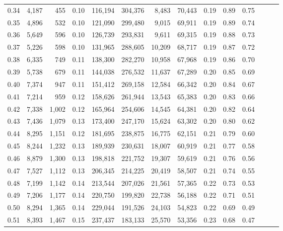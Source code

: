\begin{tabular}{rrrrrrrrrrrrrr}
0.34 &   4,187 &    455 &  0.10 &  116,194 &  304,376 &   8,483 &  70,443 &  0.19 &  0.89 &      0.75 \\
0.35 &   4,896 &    532 &  0.10 &  121,090 &  299,480 &   9,015 &  69,911 &  0.19 &  0.89 &      0.74 \\
0.36 &   5,649 &    596 &  0.10 &  126,739 &  293,831 &   9,611 &  69,315 &  0.19 &  0.88 &      0.73 \\
0.37 &   5,226 &    598 &  0.10 &  131,965 &  288,605 &  10,209 &  68,717 &  0.19 &  0.87 &      0.72 \\
0.38 &   6,335 &    749 &  0.11 &  138,300 &  282,270 &  10,958 &  67,968 &  0.19 &  0.86 &      0.70 \\
0.39 &   5,738 &    679 &  0.11 &  144,038 &  276,532 &  11,637 &  67,289 &  0.20 &  0.85 &      0.69 \\
0.40 &   7,374 &    947 &  0.11 &  151,412 &  269,158 &  12,584 &  66,342 &  0.20 &  0.84 &      0.67 \\
0.41 &   7,214 &    959 &  0.12 &  158,626 &  261,944 &  13,543 &  65,383 &  0.20 &  0.83 &      0.66 \\
0.42 &   7,338 &  1,002 &  0.12 &  165,964 &  254,606 &  14,545 &  64,381 &  0.20 &  0.82 &      0.64 \\
0.43 &   7,436 &  1,079 &  0.13 &  173,400 &  247,170 &  15,624 &  63,302 &  0.20 &  0.80 &      0.62 \\
0.44 &   8,295 &  1,151 &  0.12 &  181,695 &  238,875 &  16,775 &  62,151 &  0.21 &  0.79 &      0.60 \\
0.45 &   8,244 &  1,232 &  0.13 &  189,939 &  230,631 &  18,007 &  60,919 &  0.21 &  0.77 &      0.58 \\
0.46 &   8,879 &  1,300 &  0.13 &  198,818 &  221,752 &  19,307 &  59,619 &  0.21 &  0.76 &      0.56 \\
0.47 &   7,527 &  1,112 &  0.13 &  206,345 &  214,225 &  20,419 &  58,507 &  0.21 &  0.74 &      0.55 \\
0.48 &   7,199 &  1,142 &  0.14 &  213,544 &  207,026 &  21,561 &  57,365 &  0.22 &  0.73 &      0.53 \\
0.49 &   7,206 &  1,177 &  0.14 &  220,750 &  199,820 &  22,738 &  56,188 &  0.22 &  0.71 &      0.51 \\
0.50 &   8,294 &  1,365 &  0.14 &  229,044 &  191,526 &  24,103 &  54,823 &  0.22 &  0.69 &      0.49 \\
0.51 &   8,393 &  1,467 &  0.15 &  237,437 &  183,133 &  25,570 &  53,356 &  0.23 &  0.68 &      0.47 \\

\end{tabular}
